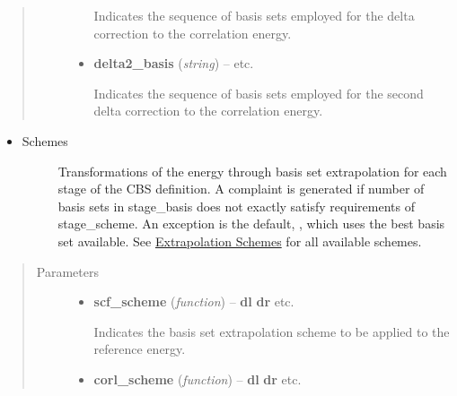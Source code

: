 \documentclass[letterpaper,10pt,english]{sphinxmanual}
\begin{document}
\begin{fulllineitems}
\begin{quote}
\begin{description}
\begin{itemize}
Indicates the sequence of basis sets employed for the delta correction
to the correlation energy.


\item {} 
\textbf{delta2\_basis} (\emph{string}) -- 
 \textbar{}\textbar{}  \textbar{}\textbar{}  \textbar{}\textbar{} etc.

Indicates the sequence of basis sets employed for the second delta correction
to the correlation energy.


\end{itemize}

\end{description}\end{quote}
\begin{itemize}
\item {} \begin{description}
\item[{Schemes}] \leavevmode
Transformations of the energy through basis set extrapolation for each
stage of the CBS definition. A complaint is generated if number of basis
sets in stage\_basis does not exactly satisfy requirements of stage\_scheme.
An exception is the default, , which uses the best basis
set available. See {\hyperref[cbs:extrapolation-schemes]{Extrapolation Schemes}} for all available schemes.

\end{description}

\end{itemize}
\begin{quote}\begin{description}
\item[{Parameters}] \leavevmode\begin{itemize}
\item {} 
\textbf{scf\_scheme} (\emph{function}) -- 
{\color{red}\bfseries{}\textbar{}dl\textbar{}}  {\color{red}\bfseries{}\textbar{}dr\textbar{}} \textbar{}\textbar{}  \textbar{}\textbar{} etc.

Indicates the basis set extrapolation scheme to be applied to the reference energy.


\item {} 
\textbf{corl\_scheme} (\emph{function}) -- 
{\color{red}\bfseries{}\textbar{}dl\textbar{}}  {\color{red}\bfseries{}\textbar{}dr\textbar{}} \textbar{}\textbar{}  \textbar{}\textbar{} etc.


\end{itemize}
\end{description}
\end{quote}
\end{fulllineitems}
\end{document}
